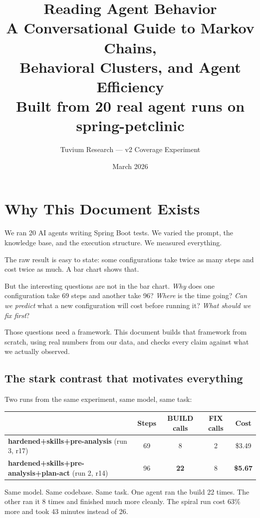 \documentclass[11pt,a4paper]{article}
\title{\textbf{Reading Agent Behavior}\\[0.4em]
\large A Conversational Guide to Markov Chains,\\
Behavioral Clusters, and Agent Efficiency\\[0.6em]
\normalsize Built from 20 real agent runs on spring-petclinic}
\author{Tuvium Research --- v2 Coverage Experiment}
\date{March 2026}
\begin{document}
\maketitle
\tableofcontents
\newpage

\section{Why This Document Exists}

We ran 20 AI agents writing Spring Boot tests.
We varied the prompt, the knowledge base, and the execution structure.
We measured everything.

The raw result is easy to state:
some configurations take twice as many steps and cost twice as much.
A bar chart shows that.

But the interesting questions are not in the bar chart.
\emph{Why} does one configuration take 69 steps and another take 96?
\emph{Where} is the time going?
\emph{Can we predict} what a new configuration will cost before running it?
\emph{What should we fix first}?

Those questions need a framework.
This document builds that framework from scratch,
using real numbers from our data,
and checks every claim against what we actually observed.

\subsection*{The stark contrast that motivates everything}

Two runs from the same experiment, same model, same task:

\begin{center}
\renewcommand{\arraystretch}{1.3}
\begin{tabular}{@{}lcccc@{}}
\toprule
& \textbf{Steps} & \textbf{BUILD calls} & \textbf{FIX calls} & \textbf{Cost} \\
\midrule
\textbf{hardened+skills+pre-analysis} (run 3, r17) & 69 & 8 & 2 & \$3.49 \\
\textbf{hardened+skills+pre-analysis+plan-act} (run 2, r14) & 96 & \textbf{22} & 8 & \textbf{\$5.67} \\
\bottomrule
\end{tabular}
\end{center}

Same model. Same codebase. Same task. One agent ran the build 22 times.
The other ran it 8 times and finished much more cleanly.
The spiral run cost 63\% more and took 43 minutes instead of 26.
\end{document}

